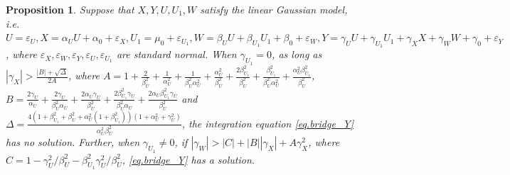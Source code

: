 \documentclass[
  12pt]{article}
\newtheorem{proposition}{Proposition}
\begin{document}
\begin{proposition}
Suppose that $X, Y, U,U_1, W$ satisfy the linear Gaussian model, \emph{i.e.} $U=\varepsilon_U,X =\alpha_U U + \alpha_0+\varepsilon_X,	U_1=\mu_0+\varepsilon_{U_1},W =\beta_U U +\beta_{U_1}U_1+\beta_0 + \varepsilon_W, Y=\gamma_U U+\gamma_{U_1}U_1 +\gamma_X X+\gamma_W W +\gamma_0 +\varepsilon_Y$, where $\varepsilon_X, \varepsilon_W, \varepsilon_Y, \varepsilon_U,\varepsilon_{U_1}$ are standard normal. When $\gamma_{U_1} = 0$, as long as $|\gamma_X|>\frac{|B|+\sqrt{\Delta}}{2A}$, where $A= 1+\frac{2}{\beta_{U}^{2}}+\frac{1}{\alpha_{U}^{2}}+\frac{1}{\beta_{U}^{2}\alpha_{U}^{2}}+\frac{\alpha_{U}^{2}}{\beta_{U}^{2}}+\frac{2\beta_{U_1}^{2}}{\beta_{U}^{2}}+\frac{\beta_{U_1}^{2}}{\beta_{U}^{2}\alpha_{U}^{2}}+\frac{\alpha_{U}^{2}\beta_{U_1}^{2}}{\beta_{U}^{2}}$, $B= \frac{2\gamma_U}{\alpha_U}+\frac{2\gamma_U}{\beta_{U}^{2}\alpha_U}+\frac{2\alpha_U\gamma_U}{\beta_{U}^{2}}+\frac{2\beta_{U_1}^{2}\gamma_U}{\beta_{U}^{2}\alpha_U}+\frac{2\alpha_U\beta_{U_1}^{2}\gamma_U}{\beta_{U}^{2}}$ and $\Delta=\frac{4\left( 1+\beta_{U_1}^{2}+\beta_{U}^{2}+\alpha_{U}^{2}\left( 1+\beta_{U_1}^{2} \right) \right) \left( 1+\alpha_{U}^{2}+\gamma_{U}^{2} \right)}{\alpha_{U}^{2}\beta_{U}^{2}}
$, the integration equation \eqref{eq.bridge_Y} has no solution. Further, when $\gamma_{U_1} \ne 0$, if $|\gamma_W| >|C|+|B||\gamma_X|+A\gamma_X^2 $, where $C=1-\gamma_{U}^{2}/\beta_{U}^{2}-\beta_{U_1}^{2}\gamma_{U}^{2}/\beta_{U}^{2}$, \eqref{eq.bridge_Y} has a solution. 
\end{proposition}
\end{document}
